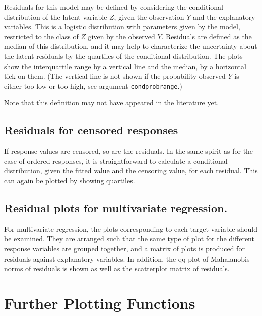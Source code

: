 \documentclass{article}
\providecommand{\T}{\texttt}
\providecommand{\Vneed}[1]{\penalty-5000\vskip#1%
\penalty-5000\vspace{-#1}}
\begin{document}
Residuals for this model may be defined by considering the conditional
distribution of the latent variable $Z$, given the observation $Y$ and the
explanatory variables. This is a logistic distribution with parameters
given by the model, restricted to the class of $Z$ given by the observed
$Y$. Residuals are defined as the median of this distribution, and 
it may help to characterize the uncertainty about the latent residuals by 
the quartiles of the conditional distribution.
The plots show the interquartile range by a vertical line and the median,
by a horizontal tick on them. (The vertical line is not shown if the 
probability observed $Y$ is either too low or too high, see argument
\T{condprobrange}.)

Note that this definition may not have appeared in the literature yet.

\subsection{Residuals for censored responses}
If response values are censored, so are the residuals. In the same spirit
as for the case of ordered responses, it is straightforward to calculate 
a conditional distribution, given the fitted value and the censoring value,
for each residual. This can again be plotted by showing quartiles.

\subsection{Residual plots for multivariate regression.}
For multivariate regression, the plots corresponding to each target
variable should be examined. 
They are arranged such that the same type of plot for the different
response variables are grouped together, and a matrix of plots is produced
for residuals against explanatory variables.
In addition, the qq-plot of Mahalanobis norms of residuals is shown as well
as the scatterplot matrix of residuals.

\Vneed{30mm}
\section{Further Plotting Functions}
\end{document}

